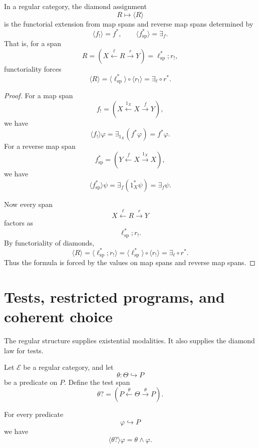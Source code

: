 \begin{theorem}
\label{thm:universal-diamond-extension}
In a regular category, the diamond assignment
\[
R\longmapsto \langle R\rangle
\]
is the functorial extension from map spans and reverse map spans determined by
\[
\langle f_!\rangle=f^\ast,
\qquad
\langle f^\ast_{\mathrm{sp}}\rangle=\exists_f.
\]
That is, for a span
\[
R=
\left(
X\xleftarrow{\ell}R\xrightarrow{r}Y
\right)
=
\ell^\ast_{\mathrm{sp}};r_!,
\]
functoriality forces
\[
\langle R\rangle
=
\langle \ell^\ast_{\mathrm{sp}}\rangle\circ \langle r_!\rangle
=
\exists_\ell\circ r^\ast.
\]
\end{theorem}

\begin{proof}
For a map span
\[
f_!
=
\left(
X\xleftarrow{1_X}X\xrightarrow{f}Y
\right),
\]
we have
\[
\langle f_!\rangle\varphi
=
\exists_{1_X}(f^\ast\varphi)
=
f^\ast\varphi.
\]
For a reverse map span
\[
f^\ast_{\mathrm{sp}}
=
\left(
Y\xleftarrow{f}X\xrightarrow{1_X}X
\right),
\]
we have
\[
\langle f^\ast_{\mathrm{sp}}\rangle\psi
=
\exists_f(1_X^\ast\psi)
=
\exists_f\psi.
\]

Now every span
\[
X\xleftarrow{\ell}R\xrightarrow{r}Y
\]
factors as
\[
\ell^\ast_{\mathrm{sp}};r_!.
\]
By functoriality of diamonds,
\[
\langle R\rangle
=
\langle \ell^\ast_{\mathrm{sp}};r_!\rangle
=
\langle \ell^\ast_{\mathrm{sp}}\rangle\circ\langle r_!\rangle
=
\exists_\ell\circ r^\ast.
\]
Thus the formula is forced by the values on map spans and reverse map spans.
\end{proof}

\section{Tests, restricted programs, and coherent choice}
\label{sec:tests-restricted-programs-coherent-choice}

The regular structure supplies existential modalities. It also supplies the diamond law for tests.

Let \(\mathcal E\) be a regular category, and let
\[
\theta:\Theta\hookrightarrow P
\]
be a predicate on \(P\). Define the test span
\[
\theta?
=
\left(
P\xleftarrow{\theta}\Theta\xrightarrow{\theta}P
\right).
\]

\begin{proposition}
\label{prop:test-law-regular}
For every predicate
\[
\varphi\hookrightarrow P
\]
we have
\[
\langle\theta?\rangle\varphi
=
\theta\wedge\varphi.
\]
\end{proposition}

